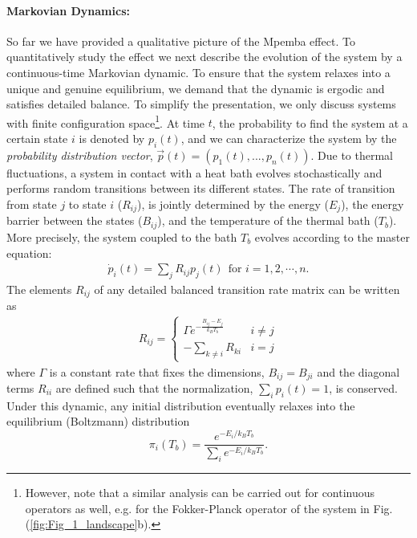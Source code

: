 \documentclass[a4paper,draft,aps,prl,preprint,superscriptaddress,nofootinbib]{revtex4}
\begin{document}
		\paragraph{Markovian Dynamics:}
		So far we have provided a qualitative picture of the Mpemba effect. To quantitatively study the effect we next describe the evolution of the system by a continuous-time Markovian dynamic. To ensure that the system relaxes into a unique and genuine equilibrium, we demand that the dynamic is ergodic and satisfies detailed balance. To simplify the presentation, we only discuss systems with finite configuration space\footnote{However, note that a similar analysis can be carried out for continuous operators as well, e.g. for the Fokker-Planck operator of the system in Fig. (\ref{fig:Fig_1_landscape}b).}. At time $t$, the probability to find the system at a certain state $i$ is denoted by $p_i(t)$, and we can characterize the system by the \emph{probability distribution vector}, $\vec p(t) = \left(p_1(t),...,p_n(t)\right)$. Due to thermal fluctuations, a system in contact with a heat bath evolves stochastically and performs random transitions between its different states. The rate of transition from state $j$ to state $i$ ($R_{ij}$), is jointly determined by the energy ($E_j$), the energy barrier between the states ($B_{ij}$), and the temperature of the thermal bath ($T_b$). More precisely, the system coupled to the bath $T_b$ evolves according to the master equation:
		\begin{eqnarray}\label{Eq:Master}
		\dot p_i(t) = \sum_j R_{ij}p_j(t)~~\text{for $i=1,2,\cdots,n$}.
		\end{eqnarray} 
		  The elements $R_{ij}$ of any detailed balanced transition rate matrix can be written as \cite{mandal2011proof} 
		\begin{eqnarray}\label{Eq:R_def}
		R_{ij} = \begin{cases}
		\Gamma e^{-\frac{B_{ij}-E_j}{k_B T_{b}}} & i\neq j\\
		-\sum_{k\neq i} R_{ki} & i=j
		\end{cases}
		\end{eqnarray}
		where $\Gamma$ is a constant rate that fixes the dimensions, $B_{ij}=B_{ji}$ and the diagonal terms $R_{ii}$ are defined such that  the normalization, $\sum_i p_i(t) = 1$, is conserved. Under this dynamic, any initial distribution eventually relaxes into the equilibrium (Boltzmann) distribution
		\begin{equation}\label{Eq:Boltzmann}
		\pi_i( T_b) = \frac{e^{-E_i/k_B T_{b}}}{\sum_i e^{-E_i/k_B T_{b}}}.
		\end{equation}
\end{document}
